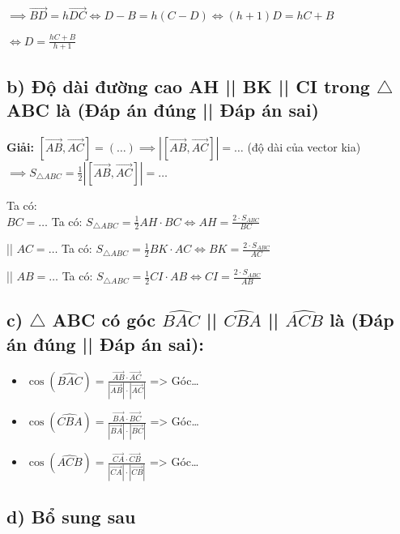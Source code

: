 \documentclass{article}
\newcommand{\triangleeq}{\ensuremath{\triangle}} %
\begin{document}
$\implies \overrightarrow{BD} = h \overrightarrow{DC} \iff D - B = h(C - D) \iff (h+1)D = hC + B$

$\iff D = \frac{hC + B}{h+1}$

\subsection*{b) Độ dài đường cao AH || BK || CI trong $\triangleeq$ ABC là (Đáp án đúng || Đáp án sai)}

\textbf{Giải:}
$[\overrightarrow{AB}, \overrightarrow{AC}] = ( \ldots ) \implies |[\overrightarrow{AB}, \overrightarrow{AC}]| = \ldots$ (độ dài của vector kia)
$\implies S_{\triangle ABC} = \frac{1}{2} |[\overrightarrow{AB}, \overrightarrow{AC}]| = \ldots$

Ta có: \\
$BC = \ldots$   Ta có: $S_{\triangle ABC} = \frac{1}{2} AH \cdot BC \iff AH = \frac{2 \cdot S_{ABC}}{BC}$

|| $AC = \ldots$   Ta có: $S_{\triangle ABC} = \frac{1}{2} BK \cdot AC \iff BK = \frac{2 \cdot S_{ABC}}{AC}$

|| $AB = \ldots$   Ta có: $S_{\triangle ABC} = \frac{1}{2} CI \cdot AB \iff CI = \frac{2 \cdot S_{ABC}}{AB}$


\subsection*{c) $\triangleeq$ ABC có góc $\widehat{BAC}$ || $\widehat{CBA}$ || $\widehat{ACB}$ là (Đáp án đúng || Đáp án sai):}

\begin{itemize}
    \item $\cos(\widehat{BAC}) = \frac{\overrightarrow{AB} \cdot \overrightarrow{AC}}{|\overrightarrow{AB}| \cdot |\overrightarrow{AC}|}$ => Góc\ldots
    \item $\cos(\widehat{CBA}) = \frac{\overrightarrow{BA} \cdot \overrightarrow{BC}}{|\overrightarrow{BA}| \cdot |\overrightarrow{BC}|}$ => Góc\ldots
    \item $\cos(\widehat{ACB}) = \frac{\overrightarrow{CA} \cdot \overrightarrow{CB}}{|\overrightarrow{CA}| \cdot |\overrightarrow{CB}|}$ => Góc\ldots
\end{itemize}

\subsection*{d) Bổ sung sau}
\end{document}

